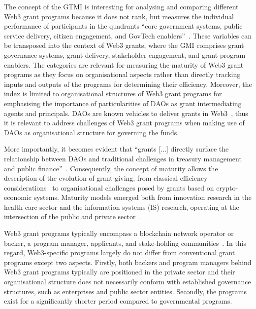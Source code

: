 \documentclass[conference]{IEEEtran}
\begin{document}
The concept of the GTMI is interesting for analysing and comparing different Web3 grant programs because it does not rank, but measures the individual performance of participants in the quadrants ``core government systems, public service delivery, citizen engagement, and GovTech enablers''~\cite[p.~5]{dener_govtech_2021}. These variables can be transposed into the context of Web3 grants, where the GMI comprises grant governance systems, grant delivery, stakeholder engagement, and grant program enablers. The categories are relevant for measuring the maturity of Web3 grant programs as they focus on organisational aspects rather than directly tracking inputs and outputs of the programs for determining their efficiency. Moreover, the index is limited to organisational structures of Web3 grant programs for emphasising the importance of particularities of DAOs as grant intermediating agents and principals. DAOs are known vehicles to deliver grants in Web3~\cite{austgen_dao_2023}, thus it is relevant to address challenges of Web3 grant programs when making use of DAOs as organisational structure for governing the funds. 


More importantly, it becomes evident that ``grants [...] directly surface the relationship between DAOs and traditional challenges in treasury management and public finance''~\cite[p.~27]{tan_open_2023}. Consequently, the concept of maturity allows the description of the evolution of grant-giving, from classical efficiency considerations~\cite{holmstrom_agency_1989} to organisational challenges posed by grants based on crypto-economic systems. Maturity models emerged both from innovation research in the health care sector and the information systems (IS) research, operating at the intersection of the public and private sector~\cite{van_ede_assembling_2024,knosp_research_2018}.

Web3 grant programs typically encompass a blockchain network operator or backer, a program manager, applicants, and stake-holding communities~\cite{gilbert_sustainable_2019,howell_financing_2017}. In this regard, Web3-specific programs largely do not differ from conventional grant programs except two aspects. Firstly, both backers and program managers behind Web3 grant programs typically are positioned in the private sector and their organisational structure does not necessarily conform with established governance structures, such as enterprises and public sector entities. Secondly, the programs exist for a significantly shorter period compared to governmental programs.
\end{document}
